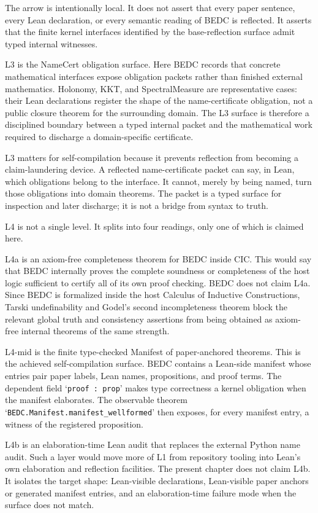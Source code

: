 The arrow is intentionally local. It does not assert that every paper sentence,
every Lean declaration, or every semantic reading of BEDC is reflected. It
asserts that the finite kernel interfaces identified by the base-reflection
surface admit typed internal witnesses.

L3 is the NameCert obligation surface. Here BEDC records that concrete
mathematical interfaces expose obligation packets rather than finished external
mathematics. Holonomy, KKT, and SpectralMeasure are representative cases:
their Lean declarations register the shape of the name-certificate obligation,
not a public closure theorem for the surrounding domain. The L3 surface is
therefore a disciplined boundary between a typed internal packet and the
mathematical work required to discharge a domain-specific certificate.

L3 matters for self-compilation because it prevents reflection from becoming a
claim-laundering device. A reflected name-certificate packet can say, in Lean,
which obligations belong to the interface. It cannot, merely by being named,
turn those obligations into domain theorems. The packet is a typed surface for
inspection and later discharge; it is not a bridge from syntax to truth.

L4 is not a single level. It splits into four readings, only one of which is
claimed here.

L4a is an axiom-free completeness theorem for BEDC inside CIC. This would say
that BEDC internally proves the complete soundness or completeness of the host
logic sufficient to certify all of its own proof checking. BEDC does not claim
L4a. Since BEDC is formalized inside the host Calculus of Inductive
Constructions, Tarski undefinability and Godel's second incompleteness theorem
block the relevant global truth and consistency assertions from being obtained
as axiom-free internal theorems of the same strength.

L4-mid is the finite type-checked Manifest of paper-anchored theorems. This is
the achieved self-compilation surface. BEDC contains a Lean-side manifest whose
entries pair paper labels, Lean names, propositions, and proof terms. The
dependent field `\verb|proof : prop|' makes type correctness a kernel obligation
when the manifest elaborates. The observable theorem
`\verb|BEDC.Manifest.manifest_wellformed|' then exposes, for every manifest
entry, a witness of the registered proposition.

L4b is an elaboration-time Lean audit that replaces the external Python name
audit. Such a layer would move more of L1 from repository tooling into Lean's
own elaboration and reflection facilities. The present chapter does not claim
L4b. It isolates the target shape: Lean-visible declarations, Lean-visible
paper anchors or generated manifest entries, and an elaboration-time failure
mode when the surface does not match.

